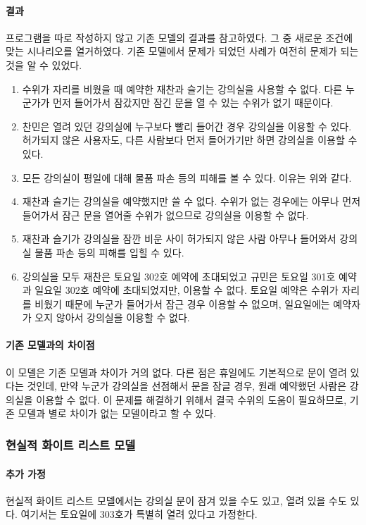 \documentclass[11pt,a4paper]{article}
\begin{document}
\paragraph{결과}
\hfill\break
\indent
프로그램을 따로 작성하지 않고 기존 모델의 결과를 참고하였다. 그 중 새로운
조건에 맞는 시나리오를 열거하였다. 기존 모델에서 문제가 되었던 사례가 여전히
문제가 되는 것을 알 수 있었다.

\begin{enumerate}
\item 수위가 자리를 비웠을 때 예약한 재찬과 슬기는 강의실을 사용할 수 없다.
다른 누군가가 먼저 들어가서 잠갔지만 잠긴 문을 열 수 있는 수위가 없기 때문이다.
\item 찬민은 열려 있던 강의실에 누구보다 빨리 들어간 경우 강의실을 이용할 수
있다. 허가되지 않은 사용자도, 다른 사람보다 먼저 들어가기만 하면 강의실을
이용할 수 있다.
\item 모든 강의실이 평일에 대해 물품 파손 등의 피해를 볼 수 있다. 이유는 위와
같다.
\item 재찬과 슬기는 강의실을 예약했지만 쓸 수 없다. 수위가 없는 경우에는 아무나
먼저 들어가서 잠근 문을 열어줄 수위가 없으므로 강의실을 이용할 수 없다.
\item 재찬과 슬기가 강의실을 잠깐 비운 사이 허가되지 않은 사람 아무나 들어와서
강의실 물품 파손 등의 피해를 입힐 수 있다.
\item 강의실을 모두 재찬은 토요일 302호 예약에 초대되었고 규민은 토요일 301호
예약과 일요일 302호 예약에 초대되었지만, 이용할 수 없다. 토요일 예약은 수위가
자리를 비웠기 때문에 누군가 들어가서 잠근 경우 이용할 수 없으며, 일요일에는
예약자가 오지 않아서 강의실을 이용할 수 없다.
\end{enumerate}

\paragraph{기존 모델과의 차이점}
\hfill\break
\indent
이 모델은 기존 모델과 차이가 거의 없다. 다른 점은 휴일에도 기본적으로 문이 열려
있다는 것인데, 만약 누군가 강의실을 선점해서 문을 잠글 경우, 원래 예약했던
사람은 강의실을 이용할 수 없다. 이 문제를 해결하기 위해서 결국 수위의 도움이
필요하므로, 기존 모델과 별로 차이가 없는 모델이라고 할 수 있다.

\subsubsection{현실적 화이트 리스트 모델}

\paragraph{추가 가정}
현실적 화이트 리스트 모델에서는 강의실 문이 잠겨 있을 수도 있고, 열려 있을 수도
있다. 여기서는 토요일에 303호가 특별히 열려 있다고 가정한다.
\end{document}
